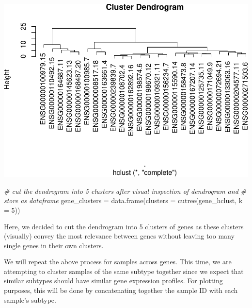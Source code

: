 \documentclass[
]{article}
\newenvironment{Shaded}{\begin{snugshade}}{\end{snugshade}}
\newcommand{\AttributeTok}[1]{\textcolor[rgb]{0.77,0.63,0.00}{#1}}
\newcommand{\CommentTok}[1]{\textcolor[rgb]{0.56,0.35,0.01}{\textit{#1}}}
\newcommand{\DecValTok}[1]{\textcolor[rgb]{0.00,0.00,0.81}{#1}}
\newcommand{\FunctionTok}[1]{\textcolor[rgb]{0.00,0.00,0.00}{#1}}
\newcommand{\NormalTok}[1]{#1}
\newcommand{\OtherTok}[1]{\textcolor[rgb]{0.56,0.35,0.01}{#1}}
\begin{document}
\includegraphics{LiuKevin_Final_Project_files/figure-latex/unnamed-chunk-14-1.pdf}

\begin{Shaded}
\begin{Highlighting}[]
\CommentTok{\# cut the dendrogram into 5 clusters after visual inspection of dendrogram and }
\CommentTok{\# store as dataframe}
\NormalTok{gene\_clusters }\OtherTok{=} \FunctionTok{data.frame}\NormalTok{(}\AttributeTok{clusters =} \FunctionTok{cutree}\NormalTok{(gene\_hclust, }\AttributeTok{k =} \DecValTok{5}\NormalTok{))}
\end{Highlighting}
\end{Shaded}

Here, we decided to cut the dendrogram into 5 clusters of genes as these
clusters (visually) convey the most relevance between genes without
leaving too many single genes in their own clusters.

\newpage

We will repeat the above process for samples across genes. This time, we
are attempting to cluster samples of the same subtype together since we
expect that similar subtypes should have similar gene expression
profiles. For plotting purposes, this will be done by concatenating
together the sample ID with each sample's subtype.
\end{document}
